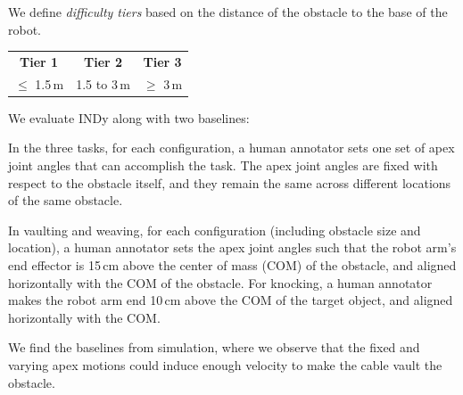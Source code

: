 We define \emph{difficulty tiers} based on the distance of the obstacle to the base of the robot.
%
\begin{table}[h]
\centering
\vspace{-6pt}
\begin{tabular}{@{}ccc@{}}
    \textbf{Tier 1} & 
    \textbf{Tier 2} & 
    \textbf{Tier 3} \\
    ${\pmb{\leq}}$ 1.5\,m &
    1.5 to 3\,m & 
    ${\pmb{\geq} }$ 3\,m
\end{tabular}
\vspace{-12pt}
\end{table}
%
%
%

We evaluate INDy along with two baselines:
%
\begin{description}[align=left,leftmargin=0pt]
    \item[Baseline with Fixed Apex.] In the three tasks, for each configuration, a human annotator sets one set of apex joint angles that can accomplish the task. The apex joint angles are fixed with respect to the obstacle itself, and they remain the same across different locations of the same obstacle.
    \item[Baseline with Varying Apex.] In vaulting and weaving, for each configuration (including obstacle size and location), a human annotator sets the apex joint angles such that the robot arm's end effector is 15\,cm above the center of mass (COM) of the obstacle, and aligned horizontally with the COM of the obstacle. For knocking, a human annotator makes the robot arm end 10\,cm above the COM of the target object, and aligned horizontally with the COM.
\end{description}

We find the baselines from simulation, where we observe that the fixed and varying apex motions could induce enough velocity to make the cable vault the obstacle.